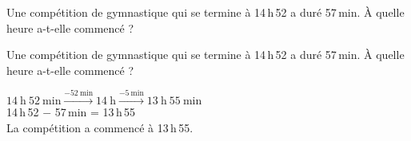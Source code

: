 \begin{exercice}
    Une compétition de gymnastique qui se termine à 14\,h\,52 a duré 57\,min. À quelle heure a-t-elle commencé ?

\end{exercice}
\begin{corrige}
    Une compétition de gymnastique qui se termine à 14\,h\,52 a duré 57\,min. À quelle heure a-t-elle commencé ?

    {\red
    $14~\text{h}~52~\text{min}\xrightarrow{-52~\text{min}} 14~\text{h} \xrightarrow{-5~\text{min}} 13~\text{h}~55~\text{min}$\\
    14\,h\,52 $-$ 57\,min = 13\,h\,55\\
    La compétition a commencé à 13\,h\,55.
    }
\end{corrige}